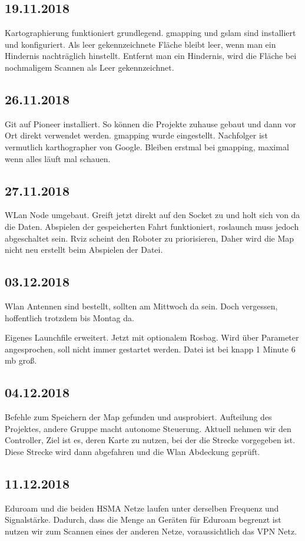 \documentclass{scrartcl}%
\begin{document}
\subsection{19.11.2018}
Kartographierung funktioniert grundlegend. gmapping und gslam sind installiert und konfiguriert. Als leer gekennzeichnete Fläche bleibt leer, wenn man ein Hindernis nachträglich hinstellt. Entfernt man ein Hindernis, wird die Fläche bei nochmaligem Scannen als Leer gekennzeichnet.

\subsection{26.11.2018}
Git auf Pioneer installiert. So können die Projekte zuhause gebaut und dann vor Ort direkt verwendet werden. gmapping wurde eingestellt. Nachfolger ist vermutlich karthographer von Google. Bleiben erstmal bei gmapping, maximal wenn alles läuft mal schauen.

\subsection{27.11.2018}
WLan Node umgebaut. Greift jetzt direkt auf den Socket zu und holt sich von da die Daten. Abspielen der gespeicherten Fahrt funktioniert, roslaunch muss jedoch abgeschaltet sein. Rviz scheint den Roboter zu priorisieren, Daher wird die Map nicht neu erstellt beim Abspielen der Datei.

\subsection{03.12.2018}
Wlan Antennen sind bestellt, sollten am Mittwoch da sein. Doch vergessen, hoffentlich trotzdem bis Montag da.

Eigenes Launchfile erweitert. Jetzt mit optionalem Rosbag. Wird über Parameter angesprochen, soll nicht immer gestartet werden. Datei ist bei knapp 1 Minute 6 mb groß.

\subsection{04.12.2018}
Befehle zum Speichern der Map gefunden und ausprobiert. Aufteilung des Projektes, andere Gruppe macht autonome Steuerung. Aktuell nehmen wir den Controller, Ziel ist es, deren Karte zu nutzen, bei der die Strecke vorgegeben ist. Diese Strecke wird dann abgefahren und die Wlan Abdeckung geprüft.

\subsection{11.12.2018}
Eduroam und die beiden HSMA Netze laufen unter derselben Frequenz und Signalstärke. Dadurch, dass die Menge an Geräten für Eduroam begrenzt ist nutzen wir zum Scannen eines der anderen Netze, voraussichtlich das VPN Netz.
\end{document}
